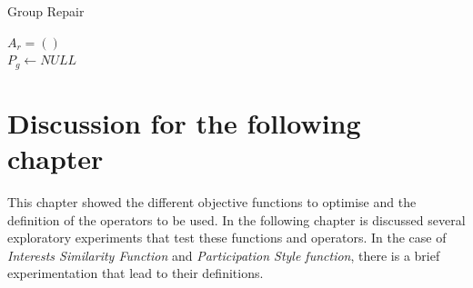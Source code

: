 \begin{algorithm}[H]
    \caption{Group Repair}
    \label{alg:repair}
    \SetAlgoLined 
    $A_r = ()$\;\\ 
    $P_g \leftarrow NULL$\;\\
\end{algorithm}

\section{Discussion for the following chapter}

This chapter showed the different objective functions to optimise and the definition of the operators to be used. In the following chapter is discussed several exploratory experiments that test these functions and operators. In the case of \textit{Interests Similarity Function} and \textit{Participation Style function}, there is a brief experimentation that lead to their definitions.